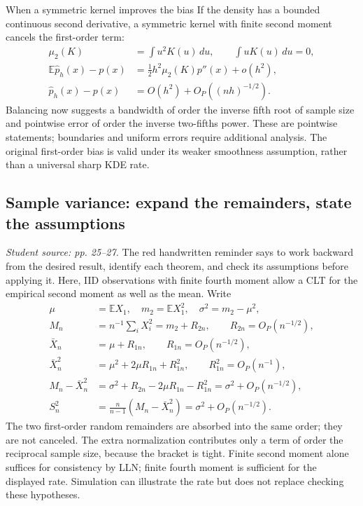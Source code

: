 \documentclass[12pt]{article}
\newcommand{\E}{\mathbb E}
\begin{document}
\begin{conceptbox}{When a symmetric kernel improves the bias}
If the density has a bounded continuous second derivative, a symmetric
kernel with finite second moment cancels the first-order term:
\begin{align}
 \mu_2(K)&=\int u^2K(u)\,du,\qquad \int uK(u)\,du=0,\\
 \E\widehat p_h(x)-p(x)&=
 \tfrac12 h^2\mu_2(K)p''(x)+o(h^2),\\
 \widehat p_h(x)-p(x)&=O(h^2)+O_P((nh)^{-1/2}).
\end{align}
Balancing now suggests a bandwidth of order the inverse fifth root of
sample size and pointwise error of order the inverse two-fifths power.
These are pointwise statements; boundaries and uniform errors require
additional analysis. The original first-order bias is valid under its
weaker smoothness assumption, rather than a universal sharp KDE rate.
\end{conceptbox}

\subsection{Sample variance: expand the remainders, state the assumptions}
\textit{Student source: pp. 25--27.}
The red handwritten reminder says to work backward from the desired result,
identify each theorem, and check its assumptions before applying it. Here,
IID observations with finite fourth moment allow a CLT for the empirical
second moment as well as the mean. Write
\begin{align}
 \mu&=\E X_1,\quad m_2=\E X_1^2,\quad \sigma^2=m_2-\mu^2,\\
 M_n&=n^{-1}\sum_iX_i^2=m_2+R_{2n},\qquad R_{2n}=O_P(n^{-1/2}),\\
 \bar X_n&=\mu+R_{1n},\qquad R_{1n}=O_P(n^{-1/2}),\\
 \bar X_n^2&=\mu^2+2\mu R_{1n}+R_{1n}^2,\qquad
 R_{1n}^2=O_P(n^{-1}),\\
 M_n-\bar X_n^2
 &=\sigma^2+R_{2n}-2\mu R_{1n}-R_{1n}^2
 =\sigma^2+O_P(n^{-1/2}),\\
 S_n^2&=\frac{n}{n-1}(M_n-\bar X_n^2)
       =\sigma^2+O_P(n^{-1/2}).
\end{align}
The two first-order random remainders are absorbed into the same order;
they are not canceled. The extra normalization contributes only a term
of order the reciprocal sample size, because the bracket is tight.
Finite second moment alone suffices for consistency by LLN; finite fourth
moment is sufficient for the displayed rate. Simulation can illustrate
the rate but does not replace checking these hypotheses.
\end{document}
